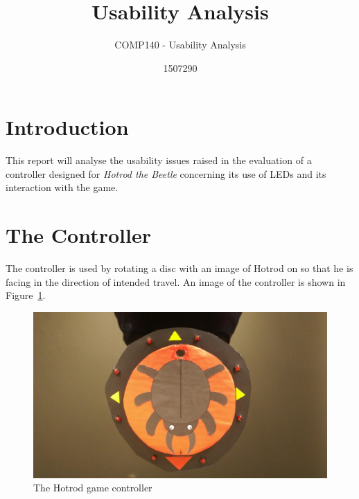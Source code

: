 \documentclass{scrartcl}
\title{Usability Analysis}
\subtitle{COMP140 - Usability Analysis}
\author{1507290}
\begin{document}
\maketitle

\abstract{}



\section{Introduction}

This report will analyse the usability issues raised in the evaluation of a controller designed for \textit{Hotrod the Beetle} concerning its use of LEDs and its interaction with the game.

\section{The Controller}
The controller is used by rotating a disc with an image of Hotrod on so that he is facing in the direction of intended travel. An image of the controller is shown in Figure~\ref{fig:controller}.
\begin{figure}
\includegraphics[width=\textwidth]{controller.jpg}
\caption{The Hotrod game controller}
\label{fig:controller}
\end{figure} 
\end{document}

